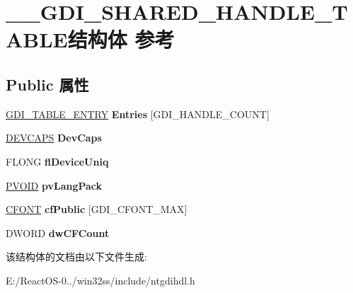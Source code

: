 \hypertarget{struct_____g_d_i___s_h_a_r_e_d___h_a_n_d_l_e___t_a_b_l_e}{}\section{\+\_\+\+\_\+\+G\+D\+I\+\_\+\+S\+H\+A\+R\+E\+D\+\_\+\+H\+A\+N\+D\+L\+E\+\_\+\+T\+A\+B\+L\+E结构体 参考}
\label{struct_____g_d_i___s_h_a_r_e_d___h_a_n_d_l_e___t_a_b_l_e}
\subsection*{Public 属性}
\begin{DoxyCompactItemize}
\item 
\mbox{\label{struct_____g_d_i___s_h_a_r_e_d___h_a_n_d_l_e___t_a_b_l_e_a04f16e7b5b2d7f64f05d7c9b31fc555f}} 
\hyperlink{struct___g_d_i___t_a_b_l_e___e_n_t_r_y}{G\+D\+I\+\_\+\+T\+A\+B\+L\+E\+\_\+\+E\+N\+T\+RY} {\bfseries Entries} \mbox{[}G\+D\+I\+\_\+\+H\+A\+N\+D\+L\+E\+\_\+\+C\+O\+U\+NT\mbox{]}
\item 
\mbox{\label{struct_____g_d_i___s_h_a_r_e_d___h_a_n_d_l_e___t_a_b_l_e_a374793d2f28decf897268645054ec484}} 
\hyperlink{struct___d_e_v_c_a_p_s}{D\+E\+V\+C\+A\+PS} {\bfseries Dev\+Caps}
\item 
\mbox{\label{struct_____g_d_i___s_h_a_r_e_d___h_a_n_d_l_e___t_a_b_l_e_ad562821d586d95891e13a205e372a49d}} 
F\+L\+O\+NG {\bfseries fl\+Device\+Uniq}
\item 
\mbox{\label{struct_____g_d_i___s_h_a_r_e_d___h_a_n_d_l_e___t_a_b_l_e_a84678d116cb3a67cdd8d354a6ee9d373}} 
\hyperlink{interfacevoid}{P\+V\+O\+ID} {\bfseries pv\+Lang\+Pack}
\item 
\mbox{\label{struct_____g_d_i___s_h_a_r_e_d___h_a_n_d_l_e___t_a_b_l_e_aa403ab4a1a99132d79be0b879b4c33cc}} 
\hyperlink{struct___c_f_o_n_t}{C\+F\+O\+NT} {\bfseries cf\+Public} \mbox{[}G\+D\+I\+\_\+\+C\+F\+O\+N\+T\+\_\+\+M\+AX\mbox{]}
\item 
\mbox{\label{struct_____g_d_i___s_h_a_r_e_d___h_a_n_d_l_e___t_a_b_l_e_aa83e8bedaf7de94c824b253b52fa8512}} 
D\+W\+O\+RD {\bfseries dw\+C\+F\+Count}
\end{DoxyCompactItemize}


该结构体的文档由以下文件生成\+:\begin{DoxyCompactItemize}
\item 
E\+:/\+React\+O\+S-\/0../win32ss/include/ntgdihdl.\+h\end{DoxyCompactItemize}
